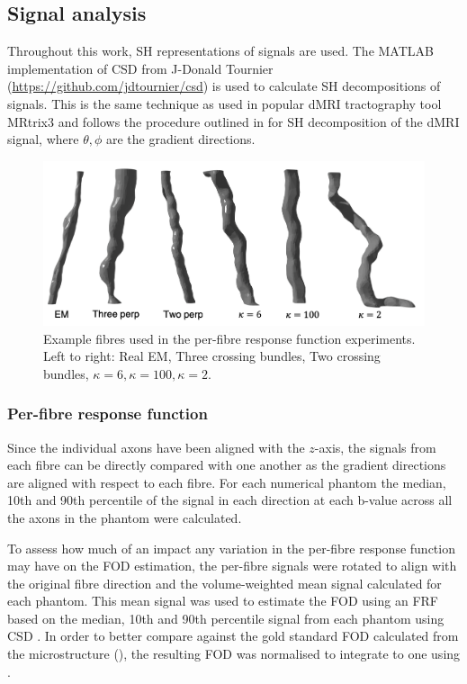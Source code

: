 \subsection{Signal analysis}
\label{sec:frf_signal_analysis}
Throughout this work, \ac{SH} representations of signals are used. The MATLAB implementation of \ac{CSD} \cite{Tournier2007} from J-Donald Tournier (\url{https://github.com/jdtournier/csd}) is used to calculate \ac{SH} decompositions of signals. This is the same technique as used in popular \ac{dMRI} tractography tool MRtrix3 \cite{Tournier2019} and follows the procedure outlined in  for \ac{SH} decomposition of the \ac{dMRI} signal, where $\theta, \phi$ are the gradient directions.
\begin{figure}
  \centering
 \includegraphics[width=\textwidth]{figures/frf_experiment/fibre_examples_caption}
  \caption[Example fibres used in the per-fibre response function experiments]{Example fibres used in the per-fibre response function experiments. Left to right: Real EM, Three crossing bundles, Two crossing bundles, $\kappa=6, \kappa=100, \kappa=2$.}
  \label{fig:frf_example_fibres}
\end{figure}
\subsubsection{Per-fibre response function}
\label{sec:frf_sig_proc_per_fibre}
Since the individual axons have been aligned with the $z$-axis, the signals from each fibre can be directly compared with one another as the gradient directions are aligned with respect to each fibre.
For each numerical phantom the median, 10th and 90th percentile of the signal in each direction at each b-value across all the axons in the phantom were calculated.

To assess how much of an impact any variation in the per-fibre response function may have on the \ac{FOD} estimation, the per-fibre signals were rotated to align with the original fibre direction and the volume-weighted mean signal calculated for each phantom. This mean signal was used to estimate the \ac{FOD} using an \ac{FRF} based on the median, 10th and 90th percentile signal from each phantom using \ac{CSD} \cite{Tournier2019,Tournier2007}. In order to better compare against the gold standard \ac{FOD} calculated from the microstructure (), the resulting \ac{FOD} was normalised to integrate to one using .

